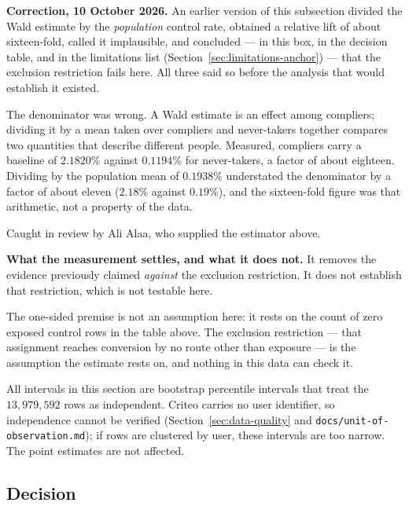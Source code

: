 \documentclass[11pt,a4paper]{article}
\begin{document}
\begin{alertbox}
\textbf{Correction, 10 October 2026.} An earlier version of this subsection divided the Wald
estimate by the \emph{population} control rate, obtained a relative lift of about sixteen-fold,
called it implausible, and concluded --- in this box, in the decision table, and in the limitations
list (Section~\ref{sec:limitations-anchor}) --- that the exclusion restriction fails here. All three
said so before the analysis that would establish it existed.

The denominator was wrong. A Wald estimate is an effect among compliers; dividing it by a mean taken
over compliers and never-takers together compares two quantities that describe different people.
Measured, compliers carry a baseline of $2.1820\%$ against $0.1194\%$ for never-takers, a factor of
about eighteen. Dividing by the population mean of $0.1938\%$ understated the denominator by a
factor of about eleven ($2.18\%$ against $0.19\%$), and the sixteen-fold figure was that arithmetic,
not a property of the data.

Caught in review by Ali Alaa, who supplied the estimator above.
\end{alertbox}

\begin{goodbox}
\textbf{What the measurement settles, and what it does not.} It removes the evidence previously
claimed \emph{against} the exclusion restriction. It does not establish that restriction, which is
not testable here.

The one-sided premise is not an assumption here: it rests on the count of zero exposed control rows
in the table above. The exclusion restriction --- that assignment reaches conversion by no route
other than exposure --- is the assumption the estimate rests on, and nothing in this data can check
it.
\end{goodbox}

All intervals in this section are bootstrap percentile intervals that treat the
$13{,}979{,}592$ rows as independent. Criteo carries no user identifier, so independence cannot be
verified (Section~\ref{sec:data-quality} and \texttt{docs/unit-of-observation.md}); if rows are
clustered by user, these intervals are too narrow. The point estimates are not affected.

\subsection{Decision}
\end{document}
